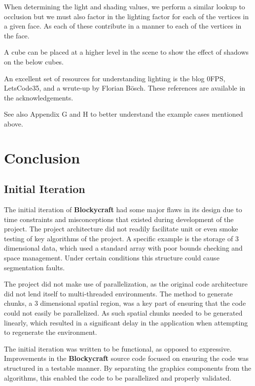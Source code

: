 \documentclass{book}
\newcommand{\Blockycraft}{\textbf{Blockycraft}}
\begin{document}
When determining the light and shading values, we perform a similar lookup to occlusion but we must also factor in the lighting factor for each of the vertices in a given face.  As each of these contribute in a manner to each of the vertices in the face.
    
A cube can be placed at a higher level in the scene to show the effect of shadows on the below cubes.
    
An excellent set of resources for understanding lighting is the blog 0FPS, LetsCode35, and a wrute-up by Florian Bösch.  These references are available in the acknowledgements.
    
See also Appendix G and H to better understand the example cases mentioned above.


\chapter{Conclusion}
\section{Initial Iteration}
The initial iteration of \Blockycraft{} had some major flaws in its design due to time constraints and misconceptions that existed during development of the project.  The project architecture did not readily facilitate unit or even smoke testing of key algorithms of the project.  A specific example is the storage of 3 dimensional data, which used a standard array with poor bounds checking and space management.  Under certain conditions this structure could cause segmentation faults.   

The project did not make use of parallelization, as the original code architecture did not lend itself to multi-threaded environments.  The method to generate chunks, a 3 dimensional spatial region, was a key part of ensuring that the code could not easily be parallelized.  As such spatial chunks needed to be generated linearly, which resulted in a significant delay in the application when attempting to regenerate the environment.

The initial iteration was written to be functional, as opposed to expressive.  Improvements in the \Blockycraft{} source code focused on ensuring the code was structured in a testable manner.  By separating the graphics components from the algorithms, this enabled the code to be parallelized and properly validated.
\end{document}
